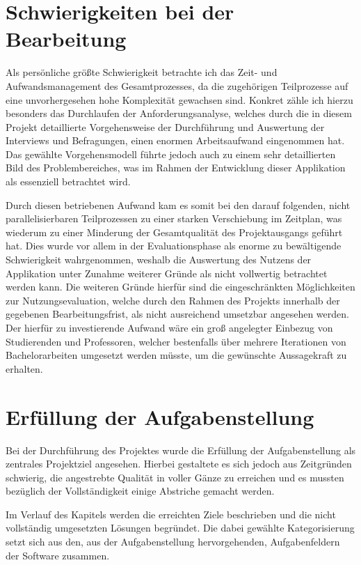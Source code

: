 \documentclass[bibliography=totoc,listof=totoc,BCOR=5mm,DIV=12,oneside]{scrbook}
\begin{document}
{\newpage
\section{Schwierigkeiten bei der Bearbeitung}
\par Als persönliche größte Schwierigkeit betrachte ich das Zeit- und Aufwandsmanagement des Gesamtprozesses, da die zugehörigen Teilprozesse auf eine unvorhergesehen hohe Komplexität gewachsen sind. Konkret zähle ich hierzu besonders das Durchlaufen der Anforderungsanalyse, welches durch die in diesem Projekt detaillierte Vorgehensweise der Durchführung und Auswertung der Interviews und Befragungen, einen enormen Arbeitsaufwand eingenommen hat. Das gewählte Vorgehensmodell führte jedoch auch zu einem sehr detaillierten Bild des Problembereiches, was im Rahmen der Entwicklung dieser Applikation als essenziell betrachtet wird. 

\par \bigskip Durch diesen betriebenen Aufwand kam es somit bei den darauf folgenden, nicht parallelisierbaren Teilprozessen zu einer starken Verschiebung im Zeitplan, was wiederum zu einer Minderung der Gesamtqualität des Projektausgangs geführt hat. Dies wurde vor allem in der Evaluationsphase als enorme zu bewältigende Schwierigkeit wahrgenommen, weshalb die Auswertung des Nutzens der Applikation unter Zunahme weiterer Gründe als nicht vollwertig betrachtet werden kann. Die weiteren Gründe hierfür sind die eingeschränkten Möglichkeiten zur Nutzungsevaluation, welche durch den Rahmen des Projekts innerhalb der gegebenen Bearbeitungsfrist, als nicht ausreichend umsetzbar angesehen werden. Der hierfür zu investierende Aufwand wäre ein groß angelegter Einbezug von Studierenden und Professoren, welcher bestenfalls über mehrere Iterationen von Bachelorarbeiten umgesetzt werden müsste, um die gewünschte Aussagekraft zu erhalten.

\section{Erfüllung der Aufgabenstellung}
\par Bei der Durchführung des Projektes wurde die Erfüllung der Aufgabenstellung als zentrales Projektziel angesehen. Hierbei gestaltete es sich jedoch aus Zeitgründen schwierig, die angestrebte Qualität in voller Gänze zu erreichen und es mussten bezüglich der Vollständigkeit einige Abstriche gemacht werden.
\par \bigskip Im Verlauf des Kapitels werden die erreichten Ziele beschrieben und die nicht vollständig umgesetzten Lösungen begründet. Die dabei gewählte Kategorisierung setzt sich aus den, aus der Aufgabenstellung hervorgehenden, Aufgabenfeldern der Software zusammen.

}
\end{document}

